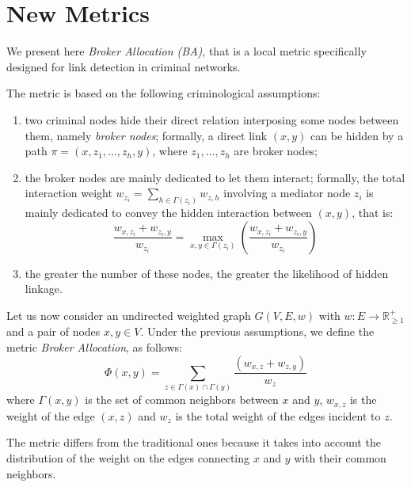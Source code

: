 \section{New Metrics}
\label{sec:new-metrics}


We present here \textit{Broker Allocation (BA)}, that is a local metric specifically designed for link detection in criminal networks.
 
The metric is based on the following criminological assumptions: 

\begin{enumerate}
	\item two criminal nodes hide their direct relation interposing some nodes between them, namely \textit{broker nodes}; formally, a direct link $(x,y)$ can be hidden by a path $\pi=(x,z_{1},\ldots,z_{h},y)$, where $z_{1},\ldots,z_{h}$ are broker nodes;
	
	\item the broker nodes are mainly dedicated to let them interact; formally, the total interaction weight $w_{z_{i}}=\sum_{h\in\Gamma(z_{i})}w_{z,h}$ involving a mediator node $z_{i}$ is mainly dedicated to convey the hidden interaction between $(x,y)$, that is:
	\begin{equation*}
		\frac{w_{x,z_{i}}+w_{z_{i},y}}{w_{z_{i}}}=\max_{x,y\in\Gamma(z_{i})}(\frac{w_{x,z_{i}}+w_{z_{i},y}}{w_{z_{i}}})
	\end{equation*}
	
	\item the greater the number of these nodes, the greater the likelihood of hidden linkage.
\end{enumerate}

Let us now consider an undirected weighted graph $G(V,E,w)$ with $w:E\rightarrow\mathbb{R}_{\geq1}^{+}$ and a pair of nodes $x,y\in V$.
%
Under the previous assumptions, we define the metric \textit{Broker Allocation}, as follows:
%
\begin{equation}
\label{eqn:ba-local}
\Phi(x,y)=
\sum\limits_{z\in\Gamma(x)\cap\Gamma(y)}
\frac{(w_{x,z}+w_{z,y})}{w_{z}}
\end{equation}
%
where 
$\Gamma(x,y)$ is the set of common neighbors between $x$ and $y$,
$w_{x,z}$ is the weight of the edge $(x,z)$ and
$w_{z}$ is the total weight of the edges incident to $z$.

The metric differs from the traditional ones because it takes into account the distribution of the weight on the edges connecting $x$ and $y$ with their common neighbors.

